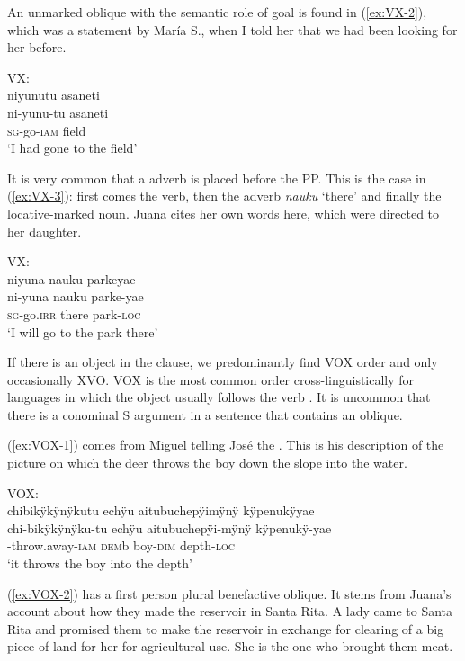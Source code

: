 An unmarked oblique with the semantic role of goal is found in (\ref{ex:VX-2}), which was a statement by María S., when I told her that we had been looking for her before.

\ea\label{ex:VX-2}
\begingl
\glpreamble \textup{VX:}\\niyunutu asaneti\\
\gla ni-yunu-tu asaneti\\
\textsc{sg}-go-\textsc{iam} field\\
\glft ‘I had gone to the field’
\endgl
\trailingcitation{[mrx-c120509l.052]}
\xe

It is very common that a  adverb is placed before the PP. This is the case in (\ref{ex:VX-3}): first comes the verb, then the adverb \textit{nauku} ‘there’ and finally the locative-marked noun. Juana cites her own words here, which were directed to her daughter. 

\ea\label{ex:VX-3}
\begingl
\glpreamble \textup{VX:}\\niyuna nauku parkeyae\\
\gla ni-yuna nauku parke-yae\\
\textsc{sg}-go.\textsc{irr} there park-\textsc{loc}\\
\glft ‘I will go to the park there’
\endgl
\trailingcitation{[jxx-p120430l-2.242]}
\xe

If there is an object in the clause, we predominantly find VOX order and only occasionally XVO. VOX is the most common order cross-linguistically for languages in which the object usually follows the verb \citep[]{wals-84}. It is uncommon that there is a conominal S argument in a sentence that contains an oblique.

(\ref{ex:VOX-1}) comes from Miguel telling José the . This is his description of the picture on which the deer throws the boy down the slope into the water.

\ea\label{ex:VOX-1}
\begingl
\glpreamble \textup{VOX:}\\chibikÿkÿnÿkutu echÿu aitubuchepÿimÿnÿ kÿpenukÿyae\\
\gla chi-bikÿkÿnÿku-tu echÿu aitubuchepÿi-mÿnÿ kÿpenukÿ-yae\\
-throw.away-\textsc{iam} \textsc{dem}b boy-\textsc{dim} depth-\textsc{loc}\\
\glft ‘it throws the boy into the depth’
\endgl
\trailingcitation{[mox-a110920l-2.153]}
\xe

(\ref{ex:VOX-2}) has a first person plural benefactive oblique. It stems from Juana’s account about how they made the reservoir in Santa Rita. A lady came to Santa Rita and promised them to make the reservoir in exchange for clearing of a big piece of land for her for agricultural use. She is the one who brought them meat.


